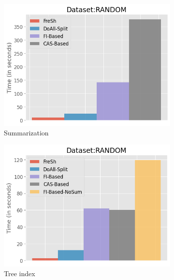 \begin{figure}[htbp]
    \begin{subfigure}{0.48\textwidth}  
        \includegraphics[width=\textwidth]{figures/Experiments/baselines-random-summarization.png}
        \caption{Summarization}
        \label{fig:eval:baselines:random:100GB:summarization}
    \end{subfigure}    
    \begin{subfigure}{0.48\textwidth}  
        \includegraphics[width=\textwidth]{figures/Experiments/baselines-random-tree.png}
        \caption{Tree index}
        \label{fig:eval:baselines:random:100GB:tree-index}
    \end{subfigure}    
    \begin{subfigure}{0.48\textwidth}  

\end{subfigure}
\end{figure}
